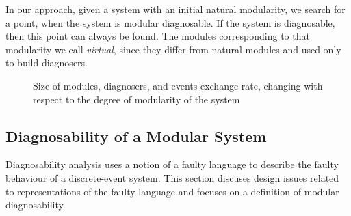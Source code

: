 In our approach, given a system with an initial natural modularity, we search
for a point, when the system is modular diagnosable. If the system is diagnosable,
then this point can always be found. The modules corresponding to that
modularity we call \emph{virtual}, since they differ from natural modules and
used only to build diagnosers.

\begin{figure}[t]
\centering
{}
\caption{Size of modules, diagnosers, and events exchange rate, changing 
with respect to the degree of modularity of the system}
\label{fig:curves}
\end{figure}



\subsection{Diagnosability of a Modular System}

Diagnosability analysis uses a notion of a faulty language to describe the
faulty behaviour of a discrete-event system. This section discuses design issues
related to representations of the faulty language and focuses on a definition
of modular diagnosability.

